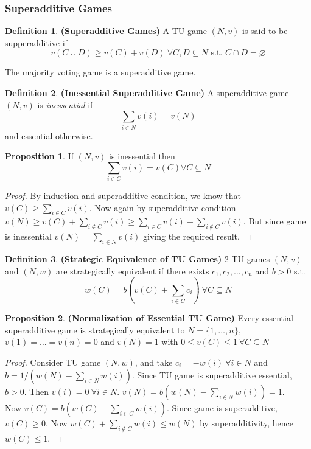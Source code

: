 \documentclass{article}
\theoremstyle{definition}
\newtheorem{defn}{Definition}[section]
\newtheorem{prop}{Proposition}[section]
\begin{document}
\subsubsection{Superadditive Games}
\begin{defn}
\textbf{(Superadditive Games)} A TU game $(N,v)$ is said to be supperadditive if $$v(C\cup D)\geq v(C) + v(D) ~\forall C,D\subseteq N \text{ s.t. } C\cap D = \varnothing$$
\end{defn}
The majority voting game is a superadditive game.
\begin{defn}
\textbf{(Inessential Superadditive Game)} A superadditive game $(N,v)$ is \textit{inessential} if $$\sum_{i \in N} v(i) = v(N)$$ and essential otherwise.
\end{defn}
\begin{prop}
If $(N,v)$ is inessential then $$\sum_{i\in C}v(i) = v(C) \forall C\subseteq N$$
\end{prop}
\begin{proof}
By induction and superadditive condition, we know that $v(C) \geq \sum_{i\in C} v(i)$. Now again by superadditive condition $v(N) \geq v(C) + \sum_{i \notin C} v(i) \geq \sum_{i \in C} v(i) + \sum_{i \notin C}v(i)$. But since game is inessential $v(N) = \sum_{i \in N}v(i)$ giving the required result.
\end{proof}
\begin{defn}
\textbf{(Strategic Equivalence of TU Games)} 2 TU games $(N,v)$ and $(N,w)$ are strategically equivalent if there exists $c_1,c_2,\dots,c_n$ and $b>0$ s.t. $$w(C) = b(v(C) + \sum_{i \in C}c_i) ~\forall C\subseteq N$$
\end{defn}
\begin{prop}
\textbf{(Normalization of Essential TU Game)} Every essential superadditive game is strategically equivalent to $N = \{1,\dots,n\}$, $v(1) = \dots = v(n) = 0$ and $v(N) = 1$ with $0 \leq v(C) \leq 1 ~\forall C\subseteq N$
\end{prop}
\begin{proof}
Consider TU game $(N,w)$, and take $c_i = -w(i)~\forall i \in N$ and $b = 1/(w(N) - \sum_{i\in N} w(i))$. Since TU game is superadditive essential, $b>0$. Then $v(i) = 0 ~\forall i \in N$. $v(N) = b(w(N) - \sum_{i \in N}w(i)) = 1$.\\
Now $v(C) = b(w(C) - \sum_{i\in C}w(i))$. Since game is superadditive, $v(C) \geq 0$. Now $w(C) + \sum_{i\notin C} w(i) \leq w(N)$ by superadditivity, hence $w(C) \leq 1$.
\end{proof}
\end{document}
